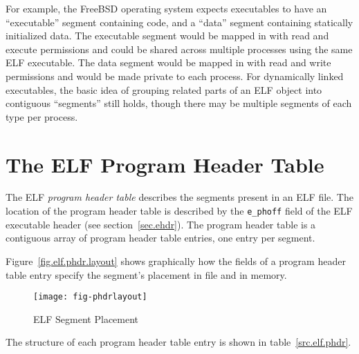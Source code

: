 \documentclass[a4paper,pdftex]{book}
\newcommand{\firstterm}[1]{\textit{#1}}
\newcommand{\parameter}[1]{\texttt{#1}}
\begin{document}
For example, the FreeBSD\texttrademark{} operating system expects
executables to have an ``executable'' segment containing code, and a
``data'' segment containing statically initialized data.%
%
The executable segment would be mapped in with read and execute
permissions and could be shared across multiple processes using the
same ELF executable.  The data segment would be mapped in with read
and write permissions and would be made private to each process.  For
dynamically linked executables, the basic idea of grouping related
parts of an ELF object into contiguous ``segments'' still holds,
though there may be multiple segments of each type per process.

\section{The ELF Program Header Table}

The ELF \firstterm{program header table}
describes the segments present in an ELF file.  The location of the
program header table is described by the \parameter{e\_phoff} field of
the ELF executable header (see section~\vref{sec.ehdr}).  The program
header table is a contiguous array of program header table entries,
one entry per segment.

Figure~\vref{fig.elf.phdr.layout} shows graphically how the fields of
a program header table entry specify the segment's placement in file
and in memory.

\begin{figure}
  \caption{ELF Segment Placement}\label{fig.elf.phdr.layout}
  \begin{center}
    \texttt{[image: fig-phdrlayout]}
  \end{center}
\end{figure}

The structure of each program header table entry is shown in
table~\vref{src.elf.phdr}.
\end{document}
